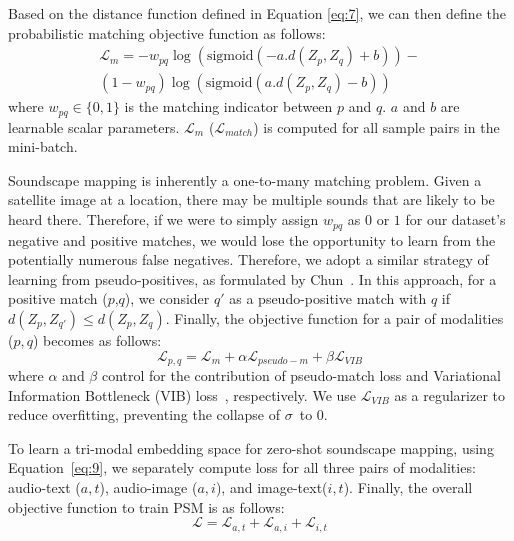 Based on the distance function defined in Equation \ref{eq:7}, we can then define the probabilistic matching objective function as follows:
%
\begin{equation}\label{eq:13}
\begin{split}
\mathcal{L}_{m} = -w_{pq}\log(\text{sigmoid}(-a.d(Z_p,Z_q)+b))- \\
(1-w_{pq})\log(\text{sigmoid}(a.d(Z_p,Z_q)-b))
\end{split}
\end{equation}
%
where $w_{pq} \in \{0,1\}$ is the matching indicator between $p$ and $q$. $a$ and $b$ are learnable scalar parameters. $\mathcal{L}_{m}$ ($\mathcal{L}_{match}$) is computed for all sample pairs in the mini-batch. 

Soundscape mapping is inherently a one-to-many matching problem. Given a satellite image at a location, there may be multiple sounds that are likely to be heard there. Therefore, if we were to simply assign $w_{pq}$ as $0$ or $1$ for our dataset's negative and positive matches, we would lose the opportunity to learn from the potentially numerous false negatives. Therefore, we adopt a similar strategy of learning from pseudo-positives, as formulated by Chun~\cite{chun2023improved}. In this approach, for a positive match ($p$,$q$), we consider $q'$ as a pseudo-positive match with $q$ if $d(Z_{p}, Z_{q'}) \leq d(Z_{p}, Z_{q})$. Finally, the objective function for a pair of modalities ($p,q$) becomes as follows:
%
\begin{equation}\label{eq:14}
\mathcal{L}_{p,q} = \mathcal{L}_{m} + \alpha\mathcal{L}_{pseudo-m} + \beta\mathcal{L}_{VIB}
\end{equation}
%
where $\alpha$ and $\beta$ control for the contribution of pseudo-match loss and Variational Information Bottleneck (VIB) loss~\cite{alemi2019deep}, respectively. We use $\mathcal{L}_{VIB}$ as a regularizer to reduce overfitting, preventing the collapse of $\sigma$~to 0.%

To learn a tri-modal embedding space for zero-shot soundscape mapping, using Equation~\ref{eq:9}, we separately compute loss for all three pairs of modalities: audio-text ($a,t$), audio-image ($a,i$), and image-text($i,t$). Finally, the overall objective function to train PSM is as follows:
%
\begin{equation}\label{eq:15}
\mathcal{L} = \mathcal{L}_{a,t} + \mathcal{L}_{a,i} + \mathcal{L}_{i,t}
\end{equation}


